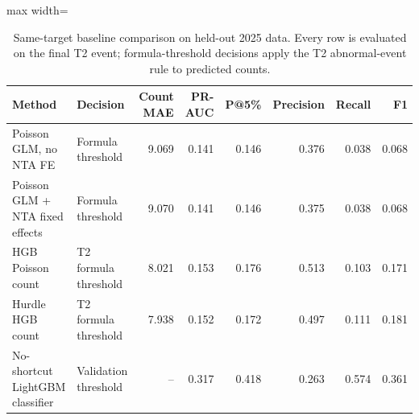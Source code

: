 \begin{table}[t]
\caption{Same-target baseline comparison on held-out 2025 data. Every row is evaluated on the final T2 event; formula-threshold decisions apply the T2 abnormal-event rule to predicted counts.}\label{tab:model_comparison}
\centering
\begin{adjustbox}{max width=\textwidth}
\begin{tabular}{@{}llrrrrrr@{}}
\toprule
Method & Decision & Count MAE & PR-AUC & P@5\% & Precision & Recall & F1 \\
\midrule
Poisson GLM, no NTA FE & Formula threshold & 9.069 & 0.141 & 0.146 & 0.376 & 0.038 & 0.068 \\
Poisson GLM + NTA fixed effects & Formula threshold & 9.070 & 0.141 & 0.146 & 0.375 & 0.038 & 0.068 \\
HGB Poisson count & T2 formula threshold & 8.021 & 0.153 & 0.176 & 0.513 & 0.103 & 0.171 \\
Hurdle HGB count & T2 formula threshold & 7.938 & 0.152 & 0.172 & 0.497 & 0.111 & 0.181 \\
No-shortcut LightGBM classifier & Validation threshold & -- & 0.317 & 0.418 & 0.263 & 0.574 & 0.361 \\
\bottomrule
\end{tabular}
\end{adjustbox}
\end{table}
